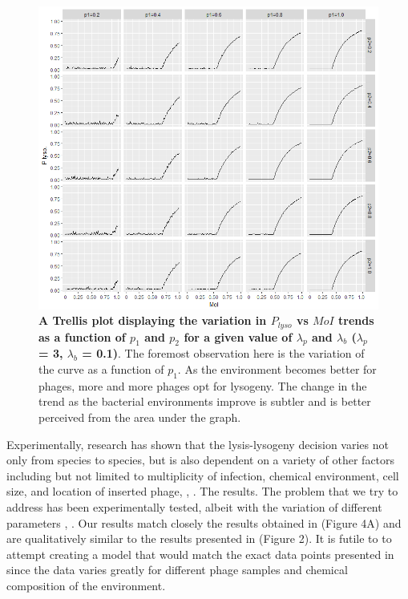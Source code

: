 \documentclass[12pt,letterpaper]{article}
\begin{document}
\begin{figure}[H]
\hspace*{-1.05in}
\includegraphics[width=160mm]{facet_grid4.png}
\caption{\color{Gray} \textbf{A Trellis plot displaying the variation in $P_{lyso}$ vs $MoI$ trends as a function of $p_1$ and $p_2$ for a given value of $\lambda_p$ and $\lambda_b$ ($\lambda_p$ = 3, $\lambda_b$ = 0.1)}. The foremost observation here is the variation of the curve as a function of $p_1$. As the environment becomes better for phages, more and more phages opt for lysogeny. The change in the trend as the bacterial environments improve is subtler and is better perceived from the area under the graph.}

\label{fig2} %

\end{figure}
\newpage
Experimentally, research has shown that the lysis-lysogeny decision varies not only from species to species, but is also dependent on a variety of other factors including but not limited to multiplicity of infection, chemical environment, cell size, and location of inserted phage\cite{kourilsky1973lysogenization}, \cite{kourilsky1975lysogenization}, \cite{zeng2010decision}. The results. The problem that we try to address has been experimentally tested, albeit with the variation of different parameters \cite{kourilsky1973lysogenization}, \cite{zeng2010decision}. Our results match closely the results obtained in \cite{zeng2010decision} (Figure 4A) and are qualitatively similar to the results presented in \cite{kourilsky1973lysogenization} (Figure 2). It is futile to to attempt creating a model that would match the exact data points presented in \cite{kourilsky1973lysogenization} since the data varies greatly for different phage samples and chemical composition of the environment.
\end{document}
